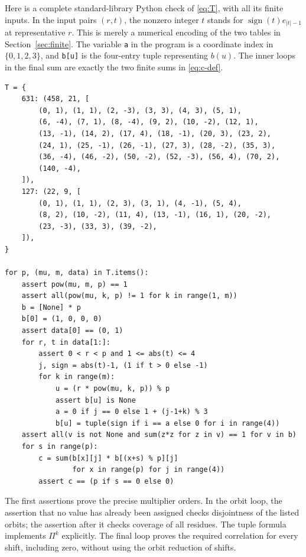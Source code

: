 \documentclass[10pt]{article}
\begin{document}
Here is a complete standard-library Python check of \eqref{eq:T}, with
all its finite inputs. In the input pairs $(r,t)$, the nonzero integer $t$
stands for $\operatorname{sign}(t)e_{|t|-1}$ at representative $r$.
This is merely a numerical encoding of the two tables in
Section~\ref{sec:finite}. The variable \texttt{a} in the program is a
coordinate index in $\{0,1,2,3\}$, and \texttt{b[u]} is the four-entry
tuple representing $b(u)$. The inner loops in the final sum are exactly
the two finite sums in \eqref{eq:c-def}.
\begin{verbatim}
T = {
    631: (458, 21, [
        (0, 1), (1, 1), (2, -3), (3, 3), (4, 3), (5, 1),
        (6, -4), (7, 1), (8, -4), (9, 2), (10, -2), (12, 1),
        (13, -1), (14, 2), (17, 4), (18, -1), (20, 3), (23, 2),
        (24, 1), (25, -1), (26, -1), (27, 3), (28, -2), (35, 3),
        (36, -4), (46, -2), (50, -2), (52, -3), (56, 4), (70, 2),
        (140, -4),
    ]),
    127: (22, 9, [
        (0, 1), (1, 1), (2, 3), (3, 1), (4, -1), (5, 4),
        (8, 2), (10, -2), (11, 4), (13, -1), (16, 1), (20, -2),
        (23, -3), (33, 3), (39, -2),
    ]),
}

for p, (mu, m, data) in T.items():
    assert pow(mu, m, p) == 1
    assert all(pow(mu, k, p) != 1 for k in range(1, m))
    b = [None] * p
    b[0] = (1, 0, 0, 0)
    assert data[0] == (0, 1)
    for r, t in data[1:]:
        assert 0 < r < p and 1 <= abs(t) <= 4
        j, sign = abs(t)-1, (1 if t > 0 else -1)
        for k in range(m):
            u = (r * pow(mu, k, p)) % p
            assert b[u] is None
            a = 0 if j == 0 else 1 + (j-1+k) % 3
            b[u] = tuple(sign if i == a else 0 for i in range(4))
    assert all(v is not None and sum(z*z for z in v) == 1 for v in b)
    for s in range(p):
        c = sum(b[x][j] * b[(x+s) % p][j]
                for x in range(p) for j in range(4))
        assert c == (p if s == 0 else 0)
\end{verbatim}
The first assertions prove the precise multiplier orders. In the orbit
loop, the assertion that no value has already been assigned checks
disjointness of the listed orbits; the assertion after it checks coverage
of all residues. The tuple formula implements $\Pi^k$ explicitly.
The final loop proves the required correlation for every shift, including
zero, without using the orbit reduction of shifts.
\end{document}

